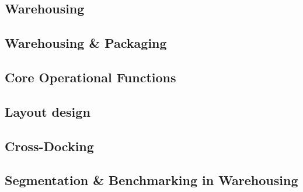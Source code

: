 \documentclass{jorbnc_cheatsheet}
\begin{document}
\begin{multicols*}{4}



\subsubsectionbox{$\infty:\infty$}{}{
}


\subsection{Warehousing}



\subsection{Warehousing \& Packaging}


\subsection{Core Operational Functions}








\subsection{Layout design}



\subsection{Cross-Docking}


\subsection{Segmentation \& Benchmarking in Warehousing}


\end{multicols*}
\end{document}
